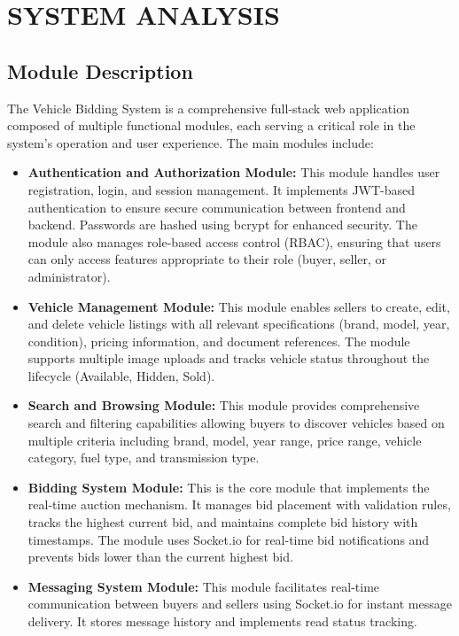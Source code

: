 \chapter{SYSTEM ANALYSIS}
 
\section{Module Description}
The Vehicle Bidding System is a comprehensive full-stack web application composed of multiple functional modules, each serving a critical role in the system's operation and user experience. The main modules include:

\begin{itemize}
    \item \textbf{Authentication and Authorization Module:} This module handles user registration, login, and session management. It implements JWT-based authentication to ensure secure communication between frontend and backend. Passwords are hashed using bcrypt for enhanced security. The module also manages role-based access control (RBAC), ensuring that users can only access features appropriate to their role (buyer, seller, or administrator).
    
    \item \textbf{Vehicle Management Module:} This module enables sellers to create, edit, and delete vehicle listings with all relevant specifications (brand, model, year, condition), pricing information, and document references. The module supports multiple image uploads and tracks vehicle status throughout the lifecycle (Available, Hidden, Sold).
    
    \item \textbf{Search and Browsing Module:} This module provides comprehensive search and filtering capabilities allowing buyers to discover vehicles based on multiple criteria including brand, model, year range, price range, vehicle category, fuel type, and transmission type.
    
    \item \textbf{Bidding System Module:} This is the core module that implements the real-time auction mechanism. It manages bid placement with validation rules, tracks the highest current bid, and maintains complete bid history with timestamps. The module uses Socket.io for real-time bid notifications and prevents bids lower than the current highest bid.
    
    \item \textbf{Messaging System Module:} This module facilitates real-time communication between buyers and sellers using Socket.io for instant message delivery. It stores message history and implements read status tracking.
    

\end{itemize}
